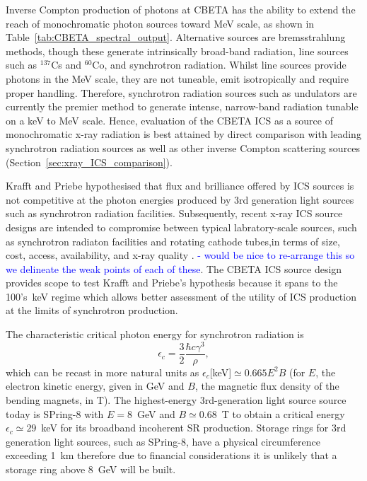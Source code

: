\documentclass[../main.tex]{subfiles}
\begin{document}

Inverse Compton production of photons at CBETA has the ability to extend the reach of monochromatic photon sources toward \si{\mega\electronvolt} scale, as shown in Table~\ref{tab:CBETA_spectral_output}. Alternative sources are bremsstrahlung methods, though these generate intrinsically broad-band radiation, line sources such as $^{137}$Cs and $^{60}$Co, and synchrotron radiation. Whilst line sources provide photons in the \si{\mega\electronvolt} scale, they are not tuneable, emit isotropically and require proper handling. Therefore, synchrotron radiation sources such as undulators are currently the premier method to generate intense, narrow-band radiation tunable on a \si{\kilo\electronvolt} to \si{\mega\electronvolt} scale. Hence, evaluation of the CBETA ICS as a source of monochromatic x-ray radiation is best attained by direct comparison with leading synchrotron radiation sources as well as other inverse Compton scattering sources (Section~\ref{sec:xray_ICS_comparison}).   

Krafft and Priebe \cite{krafft2010compton} hypothesised that flux and brilliance offered by ICS sources is not competitive at the photon energies produced by 3rd generation light sources such as synchrotron radiation facilities. Subsequently, recent x-ray ICS source designs are intended to compromise between typical labratory-scale sources, such as synchrotron radiaton facilities and rotating cathode tubes,in terms of size, cost, access, availability, and x-ray quality \cite{deitrick2018high}. \textcolor{blue}{- would be nice to re-arrange this so we delineate the weak points of each of these}.
The CBETA ICS source design provides scope to test Krafft and Priebe's hypothesis because it spans to the 100's~\si{\kilo\electronvolt} regime which allows better assessment of the utility of ICS production at the limits of synchrotron production.

The characteristic critical photon energy for synchrotron radiation is
\begin{equation}
\epsilon_{c}=\frac{3}{2}\frac{\hbar c \gamma^3}{\rho},
\label{eq:synchrotron_critical_energy}
\end{equation}
which can be recast in more natural units as $\epsilon_{c}$[\si{\kilo\electronvolt}]$\simeq 0.665E^{2}B$ (for $E$, the electron kinetic energy, given in \si{\giga\electronvolt} and $B$, the magnetic flux density of the bending magnets, in \si{\tesla}). The highest-energy 3rd-generation light source source today is SPring-8 with $E = 8$~\si{\giga\electronvolt} and $B\simeq 0.68$~\si{\tesla} to obtain a critical energy $\epsilon_{c}\simeq 29$~\si{\kilo\electronvolt} for its broadband incoherent SR production. Storage rings for 3rd generation light sources, such as SPring-8, have a physical circumference exceeding 1~\si{\kilo\meter} therefore due to financial considerations it is unlikely that a storage ring above 8~\si{\giga\electronvolt} will be built. 
\end{document}

